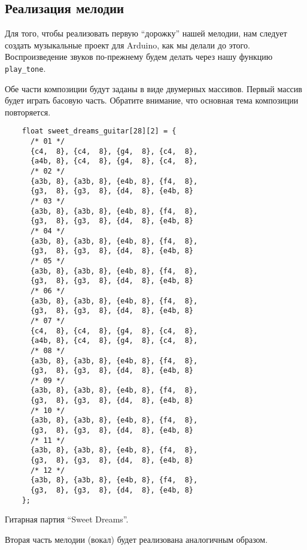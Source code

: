 \documentclass[../sparc.tex]{subfiles}
\begin{document}
\newpage
\subsection{Реализация мелодии}

Для того, чтобы реализовать первую ``дорожку'' нашей мелодии, нам следует
создать музыкальные проект для Arduino, как мы делали до этого.  Воспроизведение
звуков по-прежнему будем делать через нашу функцию \texttt{play\_tone}.

Обе части композиции будут заданы в виде двумерных массивов.  Первый массив
будет играть басовую часть.  Обратите внимание, что основная тема композиции
повторяется.

\begin{listing}[H]
  \begin{verbatim}
    float sweet_dreams_guitar[28][2] = {
      /* 01 */
      {c4,  8}, {c4,  8}, {g4,  8}, {с4,  8},
      {a4b, 8}, {c4,  8}, {g4,  8}, {с4,  8},
      /* 02 */
      {a3b, 8}, {a3b, 8}, {e4b, 8}, {f4,  8},
      {g3,  8}, {g3,  8}, {d4,  8}, {e4b, 8}
      /* 03 */
      {a3b, 8}, {a3b, 8}, {e4b, 8}, {f4,  8},
      {g3,  8}, {g3,  8}, {d4,  8}, {e4b, 8}
      /* 04 */
      {a3b, 8}, {a3b, 8}, {e4b, 8}, {f4,  8},
      {g3,  8}, {g3,  8}, {d4,  8}, {e4b, 8}
      /* 05 */
      {a3b, 8}, {a3b, 8}, {e4b, 8}, {f4,  8},
      {g3,  8}, {g3,  8}, {d4,  8}, {e4b, 8}
      /* 06 */
      {a3b, 8}, {a3b, 8}, {e4b, 8}, {f4,  8},
      {g3,  8}, {g3,  8}, {d4,  8}, {e4b, 8}
      /* 07 */
      {c4,  8}, {c4,  8}, {g4,  8}, {с4,  8},
      {a4b, 8}, {c4,  8}, {g4,  8}, {с4,  8},
      /* 08 */
      {a3b, 8}, {a3b, 8}, {e4b, 8}, {f4,  8},
      {g3,  8}, {g3,  8}, {d4,  8}, {e4b, 8}
      /* 09 */
      {a3b, 8}, {a3b, 8}, {e4b, 8}, {f4,  8},
      {g3,  8}, {g3,  8}, {d4,  8}, {e4b, 8}
      /* 10 */
      {a3b, 8}, {a3b, 8}, {e4b, 8}, {f4,  8},
      {g3,  8}, {g3,  8}, {d4,  8}, {e4b, 8}
      /* 11 */
      {a3b, 8}, {a3b, 8}, {e4b, 8}, {f4,  8},
      {g3,  8}, {g3,  8}, {d4,  8}, {e4b, 8}
      /* 12 */
      {a3b, 8}, {a3b, 8}, {e4b, 8}, {f4,  8},
      {g3,  8}, {g3,  8}, {d4,  8}, {e4b, 8}
    };
  \end{verbatim}
  \label{listing:music-band-sweet-dreams-1}
  \caption{Гитарная партия ``Sweet Dreams''.}
\end{listing}

Вторая часть мелодии (вокал) будет реализована аналогичным образом.
\end{document}
